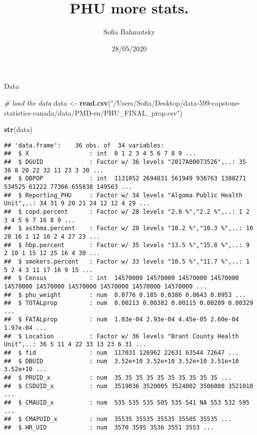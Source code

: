 \documentclass[]{article}
\title{PHU more stats.}
\author{Sofia Bahmutsky}
\date{28/05/2020}
\newenvironment{Shaded}{\begin{snugshade}}{\end{snugshade}}
\newcommand{\CommentTok}[1]{\textcolor[rgb]{0.56,0.35,0.01}{\textit{#1}}}
\newcommand{\KeywordTok}[1]{\textcolor[rgb]{0.13,0.29,0.53}{\textbf{#1}}}
\newcommand{\NormalTok}[1]{#1}
\newcommand{\StringTok}[1]{\textcolor[rgb]{0.31,0.60,0.02}{#1}}
\begin{document}
\maketitle

Data

\begin{Shaded}
\begin{Highlighting}[]
\CommentTok{\# load the data}
\NormalTok{data \textless{}{-}}\StringTok{ }\KeywordTok{read.csv}\NormalTok{(}\StringTok{"/Users/Sofia/Desktop/data{-}599{-}capstone{-}statistics{-}canada/data/PMD{-}en/PHU\_FINAL\_prop.csv"}\NormalTok{)}

\KeywordTok{str}\NormalTok{(data)}
\end{Highlighting}
\end{Shaded}

\begin{verbatim}
## 'data.frame':    36 obs. of  34 variables:
##  $ X                 : int  0 1 2 3 4 5 6 7 8 9 ...
##  $ DGUID             : Factor w/ 36 levels "2017A00073526",..: 35 36 8 20 22 32 11 23 3 30 ...
##  $ DBPOP             : int  1131052 2694831 561949 936763 1388271 534525 61222 77366 655838 149563 ...
##  $ Reporting_PHU     : Factor w/ 34 levels "Algoma Public Health Unit",..: 34 31 9 20 21 24 12 12 4 29 ...
##  $ copd.percent      : Factor w/ 28 levels "2.0 %","2.2 %",..: 1 2 3 4 5 6 7 16 8 9 ...
##  $ asthma.percent    : Factor w/ 28 levels "10.2 %","10.3 %",..: 10 20 16 1 12 16 2 4 27 23 ...
##  $ hbp.percent       : Factor w/ 35 levels "13.5 %","15.8 %",..: 9 2 10 1 15 12 25 16 4 30 ...
##  $ smokers.percent   : Factor w/ 33 levels "10.5 %","11.7 %",..: 1 5 2 4 3 11 17 16 9 15 ...
##  $ Census            : int  14570000 14570000 14570000 14570000 14570000 14570000 14570000 14570000 14570000 14570000 ...
##  $ phu_weight        : num  0.0776 0.185 0.0386 0.0643 0.0953 ...
##  $ TOTALprop         : num  0.00213 0.00382 0.00115 0.00209 0.00329 ...
##  $ FATALprop         : num  1.83e-04 2.93e-04 4.45e-05 2.60e-04 1.97e-04 ...
##  $ Location          : Factor w/ 36 levels "Brant County Health Unit",..: 36 5 11 4 22 33 13 23 6 31 ...
##  $ fid               : num  117031 126962 22631 63544 72647 ...
##  $ DBUID             : num  3.52e+10 3.52e+10 3.52e+10 3.51e+10 3.52e+10 ...
##  $ PRUID_x           : num  35 35 35 35 35 35 35 35 35 35 ...
##  $ CSDUID_x          : num  3519036 3520005 3524002 3506008 3521010 ...
##  $ CMAUID_x          : num  535 535 535 505 535 541 NA 553 532 595 ...
##  $ CMAPUID_x         : num  35535 35535 35535 35505 35535 ...
##  $ HR_UID            : num  3570 3595 3536 3551 3553 ...

\end{verbatim}
\end{document}
